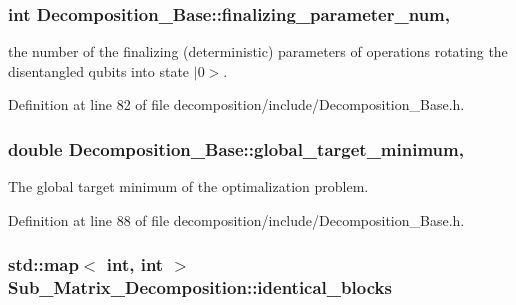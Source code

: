 \subsubsection[{\texorpdfstring{finalizing\+\_\+parameter\+\_\+num}{finalizing_parameter_num}}]{\setlength{\rightskip}{0pt plus 5cm}int Decomposition\+\_\+\+Base\+::finalizing\+\_\+parameter\+\_\+num\hspace{0.3cm}{\ttfamily [protected]}, {\ttfamily [inherited]}}\hypertarget{class_decomposition___base_ae83ca982ee7da29119245860d212864c}{}\label{class_decomposition___base_ae83ca982ee7da29119245860d212864c}


the number of the finalizing (deterministic) parameters of operations rotating the disentangled qubits into state $\vert$0$>$. 



Definition at line 82 of file decomposition/include/\+Decomposition\+\_\+\+Base.\+h.

\subsubsection[{\texorpdfstring{global\+\_\+target\+\_\+minimum}{global_target_minimum}}]{\setlength{\rightskip}{0pt plus 5cm}double Decomposition\+\_\+\+Base\+::global\+\_\+target\+\_\+minimum\hspace{0.3cm}{\ttfamily [protected]}, {\ttfamily [inherited]}}\hypertarget{class_decomposition___base_a6bc9e026221fab165ecc56f287d731a8}{}\label{class_decomposition___base_a6bc9e026221fab165ecc56f287d731a8}


The global target minimum of the optimalization problem. 



Definition at line 88 of file decomposition/include/\+Decomposition\+\_\+\+Base.\+h.

\subsubsection[{\texorpdfstring{identical\+\_\+blocks}{identical_blocks}}]{\setlength{\rightskip}{0pt plus 5cm}std\+::map$<$ int, int $>$ Sub\+\_\+\+Matrix\+\_\+\+Decomposition\+::identical\+\_\+blocks}\hypertarget{class_sub___matrix___decomposition_a9432351be5654ab8939fe7844c78bbb5}{}\label{class_sub___matrix___decomposition_a9432351be5654ab8939fe7844c78bbb5}



